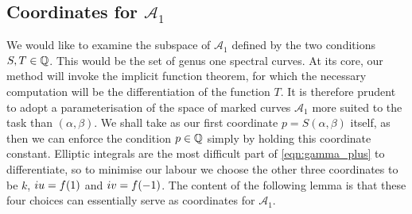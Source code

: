 \subsection{Coordinates for $\mathcal{A}_1$}
\label{sub:Reformulate}

We would like to examine the subspace of $\mathcal{A}_1$ defined by the two conditions $S,T \in \mathbb{Q}$. This would be the set of genus one spectral curves. At its core, our method will invoke the implicit function theorem, for which the necessary computation will be the differentiation of the function $T$. It is therefore prudent to adopt a parameterisation of the space of marked curves $\mathcal{A}_1$ more suited to the task than $(α,β)$. We shall take as our first coordinate $p=S(α,β)$ itself, as then we can enforce the condition $p\in\mathbb{Q}$ simply by holding this coordinate constant. Elliptic integrals are the most difficult part of \eqref{eqn:gamma_plus} to differentiate, so to minimise our labour we choose the other three coordinates to be $k$, $i u = f(1)$ and $i v = f(-1)$. The content of the following lemma is that these four choices can essentially serve as coordinates for $\mathcal{A}_1$.

